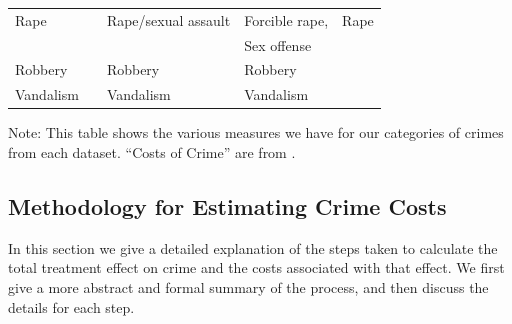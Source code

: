 \begin{table}[H]
\begin{threeparttable}
\begin{tabular}{lllll}
{Rape}			&				& Rape/sexual assault	&	Forcible rape, 	& Rape 				\\
				&				&						&	Sex offense		&					\\
{Robbery}			&				& Robbery 				&	Robbery			&					\\
{Vandalism}		&				& Vandalism				&	Vandalism		& 				\\	\bottomrule
\end{tabular}
\begin{tablenotes}
\item Note: This table shows the various measures we have for our categories of crimes from each dataset. ``Costs of Crime'' are from \cite{McCollister_etal_2010_DAD}.
\end{tablenotes}
\end{threeparttable}
\end{table}

\subsection{Methodology for Estimating Crime Costs}
\noindent In this section we give a detailed explanation of the steps taken to calculate the total treatment effect on crime and the costs associated with that effect. We first give a more abstract and formal summary of the process, and then discuss the details for each step. \\

